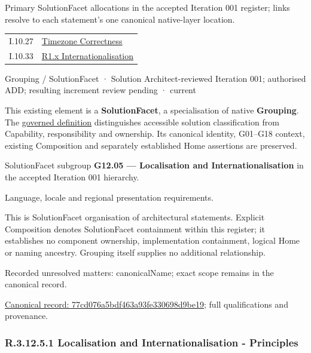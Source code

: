 Primary SolutionFacet allocations in the accepted Iteration 001 register; links resolve to each statement’s one canonical native-layer location.\par
\begin{longtable}{p{.22\linewidth}p{.73\linewidth}}
I.10.27 & \hyperref[element:3da1fba95a00438db09c342dfba8b693]{Timezone Correctness} \\
I.10.33 & \hyperref[element:920606fdc7c14a27b7e39a08105c77b6]{R1.x Internationalisation} \\
\end{longtable}
\label{element:77cd076a5bdf463a93fe330698d9be19}
{\small Grouping / SolutionFacet · Solution Architect-reviewed Iteration 001; authorised ADD; resulting increment review pending · current}\par

This existing element is a \textbf{SolutionFacet}, a specialisation of native
\textbf{Grouping}. The \href{\detokenize{../../../../../../../governance/continuum-representation.md#solutionfacet-classification--1119-candidate}}{governed definition}
distinguishes accessible solution classification from Capability, responsibility
and ownership. Its canonical identity, G01–G18 context, existing Composition
and separately established Home assertions are preserved.



SolutionFacet subgroup \textbf{G12.05 — Localisation and Internationalisation} in the accepted Iteration 001 hierarchy.



Language, locale and regional presentation requirements.



This is SolutionFacet organisation of architectural statements. Explicit Composition denotes SolutionFacet containment within this register; it establishes no component ownership, implementation containment, logical Home or naming ancestry. Grouping itself supplies no additional relationship.


{\small Recorded unresolved matters: canonicalName; exact scope remains in the canonical record.}\par
{\footnotesize \href{../../../../../../../continuum/grouping/77cd076a5bdf463a93fe330698d9be19.md}{Canonical record: 77cd076a5bdf463a93fe330698d9be19}; full qualifications and provenance.}\par
\subsubsection*{R.3.12.5.1 Localisation and Internationalisation - Principles}
\label{navigation:R.3.12.5.1}

